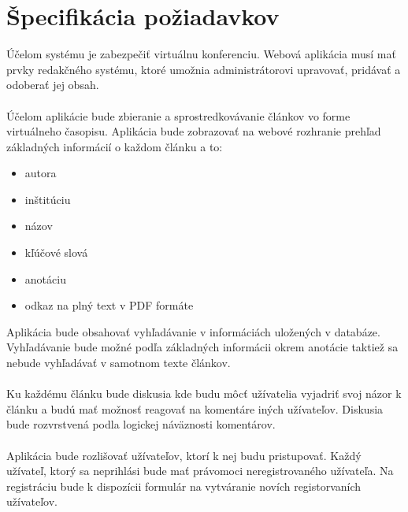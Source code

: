 \section{Špecifikácia požiadavkov}

Účelom systému je zabezpečiť virtuálnu konferenciu. Webová aplikácia musí mať prvky redakčného systému, ktoré umožnia administrátorovi upravovať, pridávať a odoberať jej obsah. \\ \\

Účelom aplikácie bude zbieranie a sprostredkovávanie článkov vo forme virtuálneho časopisu. Aplikácia bude zobrazovať na webové rozhranie prehľad základných informácií o každom článku a to:
\begin{center}
\begin{itemize}
\item autora 
\item inštitúciu
\item názov
\item kľúčové slová
\item anotáciu
\item odkaz na plný text v PDF formáte
\end{itemize}
\end{center}

Aplikácia bude obsahovať vyhľadávanie v informáciách uložených v databáze. Vyhľadávanie bude možné podľa základných informácii okrem anotácie taktiež sa nebude vyhľadávať v samotnom texte článkov.\\ \\

Ku každému článku bude diskusia kde budu môcť užívatelia vyjadriť svoj názor k článku a budú mať možnosť reagovať na komentáre iných užívateľov. Diskusia bude rozvrstvená podla logickej náväznosti komentárov.\\ \\

Aplikácia bude rozlišovať užívateľov, ktorí k nej budu pristupovať. Každý užívateľ, ktorý sa neprihlási bude mať právomoci neregistrovaného užívateľa. Na registráciu bude k dispozícii formulár na vytváranie novích registorvaních užívateľov.\\ 

